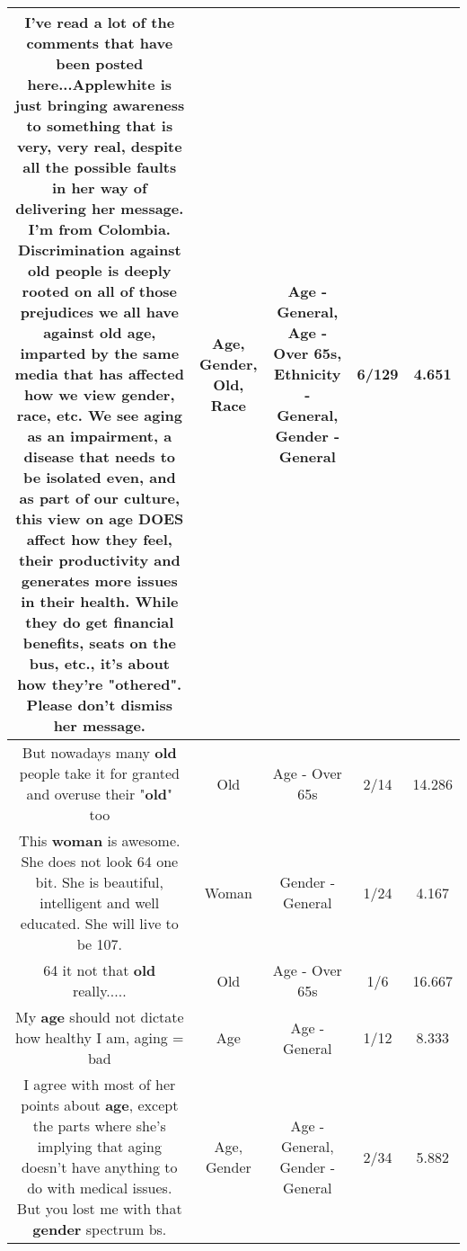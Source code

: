 \documentclass[11pt]{article}
\newlength\mylength
\begin{document}
\begin{center}
\begin{longtable}{|C{.65\mylength}|C{.30\mylength}|C{.12\mylength}|C{.12\mylength}|C{.12\mylength}|}
  \small I've read a lot of the comments that have been posted here...Applewhite is just bringing awareness to something that is very, very real, despite all the possible faults in her way of delivering her message. I'm from Colombia. Discrimination against \textbf{old} people is deeply rooted on all of those prejudices we all have against \textbf{old} \textbf{age}, imparted by the same media that has affected how we view \textbf{gender}, \textbf{race}, etc. We see aging as an impairment, a disease that needs to be isolated even, and as part of our culture, this view on \textbf{age} DOES affect how they feel, their productivity and generates more issues in their health. While they do get financial benefits, seats on the bus, etc., it's about how they're "othered". Please don't dismiss her message.\normalsize   & Age, Gender, Old, Race & Age - General, Age - Over 65s, Ethnicity - General, Gender - General & 6/129 & 4.651 \\  \hline
  \small But nowadays many \textbf{old} people take it for granted and overuse their "\textbf{old}" too\normalsize   & Old & Age - Over 65s & 2/14 & 14.286 \\  \hline
  \small This \textbf{woman} is awesome.  She does not look 64 one bit.  She is beautiful, intelligent and well educated.  She will live to be 107.\normalsize   & Woman & Gender - General & 1/24 & 4.167 \\  \hline
  \small 64 it not that \textbf{old} really.....\normalsize   & Old & Age - Over 65s & 1/6 & 16.667 \\  \hline
  \small My \textbf{age} should not dictate how healthy I am, aging = bad\normalsize   & Age & Age - General & 1/12 & 8.333 \\  \hline
  \small I agree with most of her points about \textbf{age}, except the parts where she's implying that aging doesn't have anything to do with medical issues. But you lost me with that \textbf{gender} spectrum bs.\normalsize   & Age, Gender & Age - General, Gender - General & 2/34 & 5.882 \\  \hline

\end{longtable}
\end{center}
\end{document}
